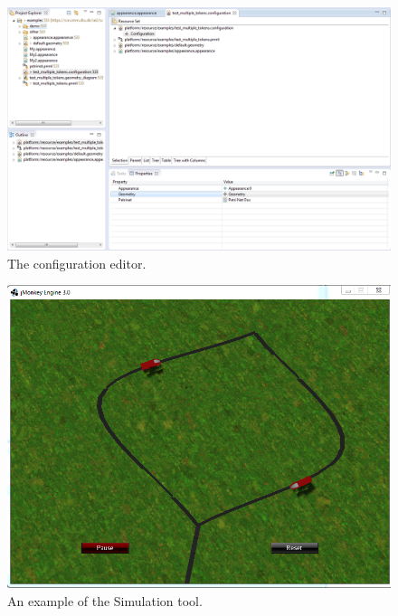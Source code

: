 \begin{figure}[ht]
\begin{center}
\includegraphics[scale=0.45]{image/ui/configuration.png}
\caption{The configuration editor.}
\label{fig:configuration}
\end{center}
\end{figure}

\begin{figure}[ht]
\begin{center}
\includegraphics[scale=0.5]{image/ui/simulator.png}
\caption{An example of the Simulation tool.}
\label{fig:simulation_tool}
\end{center}
\end{figure}
